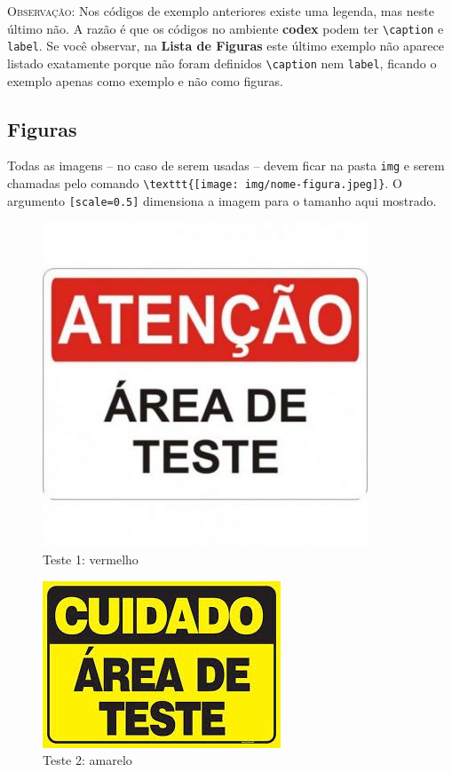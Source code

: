 \documentclass[a4paper,12pt,oneside]{memoir}
\begin{document}
\textsc{Observação:} Nos códigos de exemplo anteriores existe uma legenda, mas neste último não. A razão é que os códigos no ambiente \textbf{codex} podem ter \verb|\caption| e \verb|label|. Se você observar, na \textbf{Lista de Figuras} este último exemplo não aparece listado exatamente porque não foram definidos \verb|\caption| nem \verb|label|, ficando o exemplo apenas como exemplo e não como figuras.

\subsection{Figuras}
Todas as imagens -- no caso de serem usadas -- devem ficar na pasta \verb|img| e serem chamadas pelo comando \verb|\texttt{[image: img/nome-figura.jpeg]}|. O argumento \verb|[scale=0.5]| dimensiona a imagem para o tamanho aqui mostrado.

\begin{figure}[h!]
\begin{center}
   \includegraphics[scale=0.5]{img/teste1.jpeg}
  \caption{Teste 1: vermelho}
  \label{fig:vermelho}
\end{center}
\end{figure}

\begin{figure}[h!]
\begin{center}
   \includegraphics[scale=0.5]{img/teste2.jpeg}
  \caption{Teste 2: amarelo}
  \label{fig:amarelo}
\end{center}
\end{figure}
\end{document}

